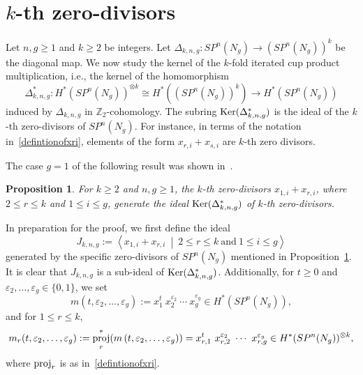 \documentclass[amscd,amssymb,verbatim,10pt]{amsart}
\numberwithin{equation}{section}
\theoremstyle{plain}
\newtheorem{proposition}[thm]{Proposition}
\theoremstyle{definition}
\DeclareMathOperator{\proj}{{\textup{proj}}}
\DeclareMathOperator{\Ker}{{\rm Ker}}
\def\Z{{\mathbb Z}}
\begin{document}
\section{$k$-th zero-divisors}\label{sec: zero-divisor}

Let $n,g\ge 1$ and $k\ge 2$ be integers. Let $\Delta_{k,n,g}\colon SP^n(N_g)\to (SP^n(N_g))^k$ be the diagonal map. We now study the kernel of the $k$-fold iterated cup product multiplication, i.e., the kernel of the homomorphism $$\Delta^*_{k,n,g}\colon H^*(SP^n(N_g))^{\otimes k}\cong H^*((SP^n(N_g))^k)\to H^*(SP^n(N_g))$$ induced by $\Delta_{k,n,g}$ in $\Z_2$-cohomology. The subring $\Ker(\Delta_{k,n,g}^*)$ is the ideal of the $k$-th zero-divisors of $SP^n(N_g)$. For instance, in terms of the notation in~\eqref{defintionofxri}, elements of the form $x_{r,i}+x_{s,i}$ are $k$-th zero divisors.

The case $g=1$ of the following result was shown in~\cite{CAG+}.

\begin{proposition}\label{prop: ideal description}
For $k\ge 2$ and $n,g\ge 1$, the $k$-th zero-divisors $x_{1,i}+x_{r,i}$, where $2\le r\le k$ and $1\le i \le g$, generate the ideal $\Ker(\Delta^*_{k,n,g})$ of $k$-th zero-divisors.
\end{proposition}

In preparation for the proof, we first define the ideal
\[
J_{k,n,g}:=\left\langle x_{1,i}+x_{r,i}\ \middle|\ 2\le r\le k \ \text{and}\ 1\le i \le g\right\rangle
\]
generated by the specific zero-divisors of $SP^n(N_g)$ mentioned in Proposition~\ref{prop: ideal description}. It is clear that $J_{k,n,g}$ is a sub-ideal of $\Ker(\Delta_{k,n,g}^*)$. Additionally, for $t\ge 0$ and $\varepsilon_{2},\ldots,\varepsilon_g\in \{0,1\}$, we set
\[
m\left(t,\varepsilon_{2},\ldots, \varepsilon_{g}\right):= x_{1}^{t} \ x_{2}^{\varepsilon_2} \ \cdots  \ x_{g}^{\varepsilon_{g}}\in H^*(SP^n(N_g)),
\]
and for $1\le r\le k$,
\[
m_r(t,\varepsilon_{2},\ldots, \varepsilon_{g}):= \proj_r^*(m\left(t,\varepsilon_{2},\ldots, \varepsilon_{g}\right))=x_{r,1}^{t} \ x_{r,2}^{\varepsilon_2} \ \cdots  \ x_{r,g}^{\varepsilon_{g}}\in H^*(SP^n(N_g))^{\otimes k},
\]
where $\proj_r$ is as in~\eqref{defintionofxri}.
\end{document}
